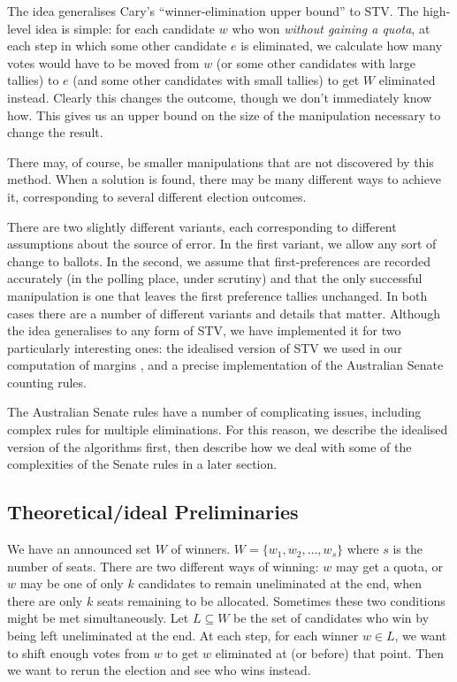 \documentclass[10pt,a4paper]{article}
\begin{document}
The idea generalises Cary's ``winner-elimination upper bound'' to STV.  The high-level idea is simple: for each candidate $w$ who won \emph{without gaining a quota}, at each step in which some other candidate $e$ is eliminated, we calculate how many votes would have to be moved from $w$ (or some other candidates with large tallies) to $e$ (and some other candidates with small tallies) to get $W$ eliminated instead.   Clearly this changes the outcome, though we don't immediately know how.
This gives us an upper bound on the size of the manipulation necessary to change the result.  

There may, of course, be smaller manipulations that are not discovered by this method.  
When a solution is found, there may be many different ways to achieve it, corresponding to several different election outcomes.  

There are two slightly different variants, each corresponding to different assumptions about the source of error.  In the first variant, we allow any sort of change to ballots.  In the second, we assume that first-preferences are recorded accurately (in the polling place, under scrutiny) and that the only successful manipulation is one that leaves the first preference tallies unchanged.  In both cases there are a number of different variants and details that matter.  Although the idea generalises to any form of STV, we have implemented it for two particularly interesting ones: the idealised version of STV we used in our computation of margins \cite{blom2015efficient}, and a precise implementation of the Australian Senate counting rules.

The Australian Senate rules have a number of complicating issues, including complex rules for multiple eliminations.  For this reason, we describe the idealised version of the algorithms first, then describe how we deal with some of the complexities of the Senate rules in a later section.

\subsection{Theoretical/ideal Preliminaries}
We have an announced set $W$ of winners.  $W = \{w_1, w_2, \ldots, w_s \}$ where $s$ is the number of seats.  There are two different ways of winning: $w$ may get a quota, or $w$ may be one of only $k$ candidates to remain uneliminated at the end, when there are only $k$ seats remaining to be allocated.  Sometimes these two conditions might be met simultaneously.  Let $L \subseteq W$ be the set of candidates who win by being left uneliminated at the end.  At each step, for each winner $w \in L$, we want to shift enough votes from $w$ to get $w$ eliminated at (or before) that point.  Then we want to rerun the election and see who wins instead.
\end{document}
